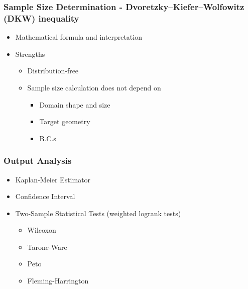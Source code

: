         

      \subsubsection{Sample Size Determination - Dvoretzky–Kiefer–Wolfowitz (DKW) inequality \cite{dvoretzky1956asymptotic}}

      \begin{itemize}
        \item Mathematical formula and interpretation
        \item Strengths
          \begin{itemize}
            \item Distribution-free
            \item Sample size calculation does not depend on 
              \begin{itemize}
                \item Domain shape and size
                \item Target geometry
                \item B.C.s
              \end{itemize}
          \end{itemize}
      \end{itemize}



      \subsubsection{Output Analysis}

        \begin{itemize}
          \item Kaplan-Meier Estimator \cite{kaplan1958nonparametric} \cite{aalen2008survival}\cite{cameron_davidson_pilon_2021_4505728}
          \item Confidence Interval \cite{greenwoodnatural} \cite{hosmer2011applied} \cite{kalbfleisch2011statistical}\cite{sawyer2003greenwood}
          \item Two-Sample Statistical Tests (weighted logrank tests) \cite{custodio2007diagnostics} \cite{agarwal2012statistics} \cite{karadeniz2017examining} \cite{leton2001equivalence} \cite{etikan2017kaplan} \cite{harrington1982class}
            \begin{itemize}
              \item Wilcoxon
              \item Tarone-Ware
              \item Peto
              \item Fleming-Harrington
            \end{itemize}
            
        \end{itemize}


        
      
      
    
      
